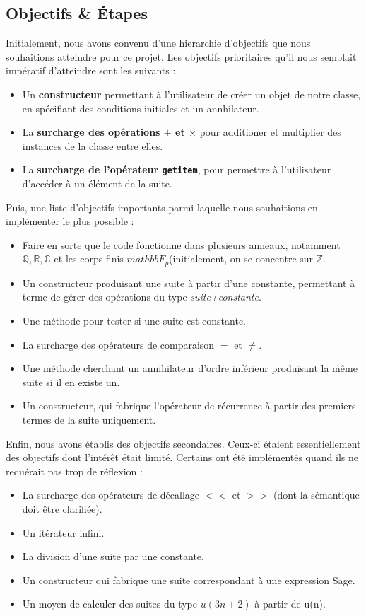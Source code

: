 \documentclass[12pt]{article}
\newlength{\charwidth}
\newcommand{\uline}{\underline{\hspace{2\charwidth}}}
\let\olditem\item
\renewcommand{\item}{\olditem[$\bullet$]}
\newcommand{\itemV}{\olditem[{\color{green} \ding{51}}]}
\newcommand{\itemX}{\olditem[{\color{red} \ding{55}}]}
\begin{document}
    \subsection{Objectifs \& Étapes}
        Initialement, nous avons convenu d'une hierarchie d'objectifs que nous souhaitions atteindre
        pour ce projet. Les objectifs prioritaires qu'il nous semblait impératif d'atteindre sont les
        suivants :
        \begin{itemize}
            \itemV Un \textbf{constructeur} permettant à l'utilisateur de créer un objet de notre classe,
                en spécifiant des conditions initiales et un annhilateur.
            \itemV La \textbf{surcharge des opérations $+$ et $\times$} pour additioner et multiplier des
                instances de la classe entre elles.
            \itemV La \textbf{surcharge de l'opérateur \texttt{\uline getitem\uline}}, pour permettre à
                l'utilisateur d'accéder à un élément de la suite.
        \end{itemize}
        Puis, une liste d'objectifs importants parmi laquelle nous souhaitions en implémenter le plus
        possible :
        \begin{itemize}
            \itemX Faire en sorte que le code fonctionne dans plusieurs anneaux, notamment
                $\mathbb{Q,R,C}$ et les corps finis $mathbb F_p$(initialement, on se 
                concentre sur $\mathbb Z$.
            \itemV Un constructeur produisant une suite à partir d'une constante, permettant à terme
                de gérer des opérations du type \emph{suite+constante}.
            \itemX Une méthode pour tester si une suite est constante.
            \itemX La surcharge des opérateurs de comparaison $=$ et $\ne$.
            \itemX Une méthode cherchant un annihilateur d'ordre inférieur produisant la même suite
                si il en existe un.
            \itemX Un constructeur, qui fabrique l'opérateur de récurrence à partir des 
                premiers termes de la suite uniquement.
        \end{itemize}

        Enfin, nous avons établis des objectifs secondaires. Ceux-ci étaient essentiellement
        des objectifs dont l'intérêt était limité. Certains ont été implémentés quand ils
        ne requérait pas trop de réflexion : 
        \begin{itemize}
            \itemX La surcharge des opérateurs de décallage $<<$ et $>>$ (dont la sémantique doit
                être clarifiée).
            \itemV Un itérateur infini.
            \itemX La division d'une suite par une constante.
            \itemX Un constructeur qui fabrique une suite correspondant à une expression Sage.
            \itemX Un moyen de calculer des suites du type $u(3n+2)$ à partir de u(n).
        \end{itemize}
\end{document}
